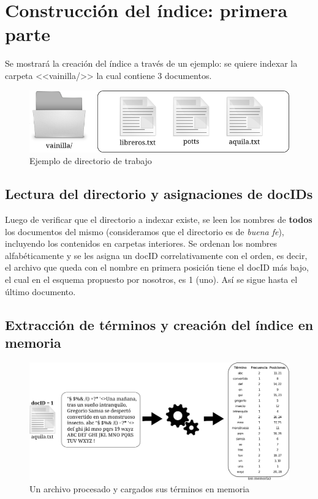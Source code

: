 \section{Construcción del índice: primera parte}

Se mostrará la creación del índice a través de un ejemplo: se quiere indexar la carpeta <<vainilla/>> la cual contiene 3 documentos.

\begin{figure}[!h]
\centering
    \includegraphics[scale=0.9]{./Images/vainillaDir.png}
\caption{Ejemplo de directorio de trabajo}
\label{fig:directorioTrabajo}
\end{figure}


\subsection{Lectura del directorio y asignaciones de docIDs}

Luego de verificar que el directorio a indexar existe, se leen los nombres de \textbf{todos} los documentos del mismo (consideramos que el directorio es de \textit{buena fe}), incluyendo los contenidos en carpetas interiores. Se ordenan los nombres alfabéticamente y se les asigna un docID correlativamente con el orden, es decir, el archivo que queda con el nombre en primera posición tiene el docID más bajo, el cual en el esquema propuesto por nosotros, es 1 (uno). Así se sigue hasta el último documento.

\subsection{Extracción de términos y creación del índice en memoria}

\begin{figure}[!h]
\centering
    \includegraphics[scale=0.9]{./Images/parseoYMem.png}
\caption{Un archivo procesado y cargados sus términos en memoria}
\label{fig:parseoymem}
\end{figure}

